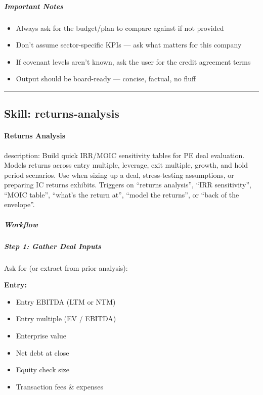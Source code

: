 \documentclass[11pt]{article}
\begin{document}
\subparagraph{Important Notes}\mbox{}\par

\begin{itemize}[leftmargin=*,itemsep=2pt,topsep=2pt]
\item {} Always ask for the budget/plan to compare against if not provided
\item {} Don't assume sector-specific KPIs — ask what matters for this company
\item {} If covenant levels aren't known, ask the user for the credit agreement terms
\item {} Output should be board-ready — concise, factual, no fluff
\end{itemize}

\vspace{0.8em}\hrule\vspace{0.8em}

\subsection{Skill: returns-analysis}\label{file:valuation-reviewer-skills-returns-analysis-SKILL-md}

\paragraph{Returns Analysis}\mbox{}\par

description: Build quick IRR/MOIC sensitivity tables for PE deal evaluation. Models returns across entry multiple, leverage, exit multiple, growth, and hold period scenarios. Use when sizing up a deal, stress-testing assumptions, or preparing IC returns exhibits. Triggers on ``returns analysis'', ``IRR sensitivity'', ``MOIC table'', ``what's the return at'', ``model the returns'', or ``back of the envelope''.


\subparagraph{Workflow}\mbox{}\par

\subparagraph{Step 1: Gather Deal Inputs}\mbox{}\par

Ask for (or extract from prior analysis):


\textbf{Entry:}

\begin{itemize}[leftmargin=*,itemsep=2pt,topsep=2pt]
\item {} Entry EBITDA (LTM or NTM)
\item {} Entry multiple (EV / EBITDA)
\item {} Enterprise value
\item {} Net debt at close
\item {} Equity check size
\item {} Transaction fees \& expenses
\end{itemize}
\end{document}
